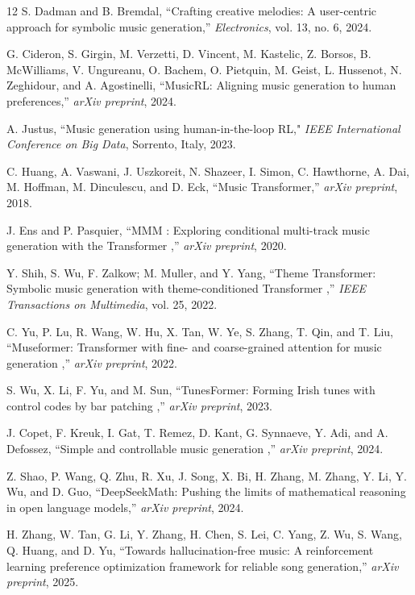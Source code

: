 \documentclass[letterpaper, 10 pt, conference]{ieeeconf}
\begin{document}
\begin{thebibliography}{12}
S. Dadman and B. Bremdal,
``Crafting creative melodies: A user-centric approach for symbolic music generation,''
\emph{Electronics}, vol. 13, no. 6, 2024.

G. Cideron, S. Girgin, M. Verzetti, D. Vincent, M. Kastelic, Z. Borsos, B. McWilliams, V. Ungureanu, O. Bachem, O. Pietquin, M. Geist, L. Hussenot, N. Zeghidour,  and A. Agostinelli, 
``MusicRL: Aligning music generation to human preferences,''
\emph{arXiv preprint}, 2024.

A. Justus, \textquotedblleft Music generation using human-in-the-loop RL," \emph{ IEEE International Conference on Big Data}, Sorrento, Italy,  
 2023.

 

C. Huang, A. Vaswani, J. Uszkoreit, N. Shazeer, I. Simon, C. Hawthorne, A. Dai, M. Hoffman, M. Dinculescu, and D. Eck,
``Music Transformer,''
\emph{arXiv preprint}, 2018.


J. Ens and P. Pasquier,
``MMM : Exploring conditional multi-track music generation with the Transformer
,''
\emph{arXiv preprint}, 2020.

Y. Shih, S. Wu, F. Zalkow; M. Muller, and Y. Yang,
``Theme Transformer: Symbolic music generation with theme-conditioned Transformer
,''
\emph{IEEE Transactions on Multimedia}, vol. 25, 2022.

C. Yu, P. Lu, R. Wang, W. Hu, X. Tan, W. Ye, S. Zhang, T. Qin, and T. Liu,
``Museformer: Transformer with fine- and coarse-grained attention for music generation
,''
\emph{arXiv preprint}, 2022.

S. Wu, X. Li, F. Yu, and M. Sun,
``TunesFormer: Forming Irish tunes with control codes by bar patching
,''
\emph{arXiv preprint}, 2023.

J. Copet, F. Kreuk, I. Gat, T. Remez, D. Kant, G. Synnaeve, Y. Adi, and A. Defossez,
``Simple and controllable music generation
,''
\emph{arXiv preprint}, 2024.



 Z. Shao, P. Wang, Q. Zhu, R. Xu, J. Song, X. Bi, H. Zhang, M. Zhang, Y. Li, Y. Wu, and D. Guo,
``DeepSeekMath: Pushing the limits of mathematical reasoning in open language models,''
\emph{arXiv preprint}, 2024.

H. Zhang, W. Tan, G. Li, Y. Zhang, H. Chen, S. Lei, C. Yang,
Z. Wu, S. Wang, Q. Huang, and D. Yu,
``Towards hallucination-free music: A reinforcement learning preference optimization framework for reliable song generation,''
\emph{arXiv preprint}, 2025.



\end{thebibliography}
\end{document}
